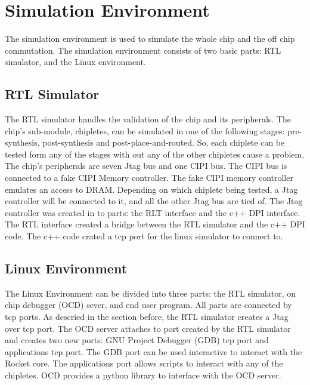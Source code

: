 \documentclass[../main.tex]{subfiles}
\begin{document}
\section{Simulation Environment}
The simulation environment is used to simulate the whole chip and the off chip commutation. The simulation environment consists of two basic parts: RTL simulator, and the Linux environment.

\subsection{RTL Simulator}
The RTL simulator handles the validation of the chip and its peripherals. The chip's sub-module, chipletes, can be simulated in one of the following stages: pre-synthesis, post-synthesis and post-place-and-routed. So, each chiplete can be tested form any of the stages with out any of the other chipletes cause a problem. The chip's peripherals are seven Jtag bus and one CIPI bus. The CIPI bus is connected to a fake CIPI Memory controller. The fake CIPI memory controller emulates an access to DRAM. Depending on which chiplete being tested, a Jtag controller will be connected to it, and all the other Jtag bus are tied of. The Jtag controller was created in to parts: the RLT interface and the c++ DPI interface. The RTL interface created a bridge between the RTL simulator and the c++ DPI code. The c++ code crated a tcp port for the linux simulator to connect to.  
\subsection{Linux Environment}
The Linux Environment can be divided into three parts: the RTL simulator, on chip debugger (OCD) sever, and end user program. All parts are connected by tcp ports. As descried in the section before, the RTL simulator creates a Jtag over tcp port. The OCD server attaches to port created by the RTL simulator and creates two new ports: GNU Project Debugger (GDB) tcp port and applications tcp port. The GDB port can be used interactive to interact with the Rocket core. The applications port allows scripts to interact with any of the chipletes. OCD provides a python library to interface with the OCD server.
\end{document}
